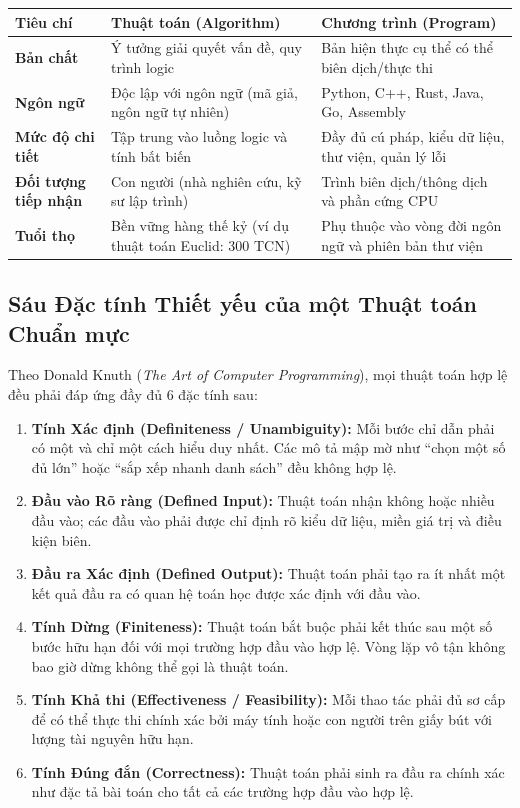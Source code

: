 \documentclass[11pt,a4paper]{article}
\begin{document}
\begin{center}
\begin{tabularx}{\textwidth}{p{3.2cm} X X}
\toprule
\textbf{Tiêu chí} & \textbf{Thuật toán (Algorithm)} & \textbf{Chương trình (Program)} \\
\midrule
\textbf{Bản chất} & Ý tưởng giải quyết vấn đề, quy trình logic & Bản hiện thực cụ thể có thể biên dịch/thực thi \\
\textbf{Ngôn ngữ} & Độc lập với ngôn ngữ (mã giả, ngôn ngữ tự nhiên) & Python, C++, Rust, Java, Go, Assembly \\
\textbf{Mức độ chi tiết} & Tập trung vào luồng logic và tính bất biến & Đầy đủ cú pháp, kiểu dữ liệu, thư viện, quản lý lỗi \\
\textbf{Đối tượng tiếp nhận} & Con người (nhà nghiên cứu, kỹ sư lập trình) & Trình biên dịch/thông dịch và phần cứng CPU \\
\textbf{Tuổi thọ} & Bền vững hàng thế kỷ (ví dụ thuật toán Euclid: 300 TCN) & Phụ thuộc vào vòng đời ngôn ngữ và phiên bản thư viện \\
\bottomrule
\end{tabularx}
\end{center}

\subsection{Sáu Đặc tính Thiết yếu của một Thuật toán Chuẩn mực}
Theo Donald Knuth (\emph{The Art of Computer Programming}), mọi thuật toán hợp lệ đều phải đáp ứng đầy đủ 6 đặc tính sau:

\begin{enumerate}[leftmargin=2em, itemsep=3pt]
    \item \textbf{Tính Xác định (Definiteness / Unambiguity):} Mỗi bước chỉ dẫn phải có một và chỉ một cách hiểu duy nhất. Các mô tả mập mờ như ``chọn một số đủ lớn'' hoặc ``sắp xếp nhanh danh sách'' đều không hợp lệ.
    \item \textbf{Đầu vào Rõ ràng (Defined Input):} Thuật toán nhận không hoặc nhiều đầu vào; các đầu vào phải được chỉ định rõ kiểu dữ liệu, miền giá trị và điều kiện biên.
    \item \textbf{Đầu ra Xác định (Defined Output):} Thuật toán phải tạo ra ít nhất một kết quả đầu ra có quan hệ toán học được xác định với đầu vào.
    \item \textbf{Tính Dừng (Finiteness):} Thuật toán bắt buộc phải kết thúc sau một số bước hữu hạn đối với mọi trường hợp đầu vào hợp lệ. Vòng lặp vô tận không bao giờ dừng không thể gọi là thuật toán.
    \item \textbf{Tính Khả thi (Effectiveness / Feasibility):} Mỗi thao tác phải đủ sơ cấp để có thể thực thi chính xác bởi máy tính hoặc con người trên giấy bút với lượng tài nguyên hữu hạn.
    \item \textbf{Tính Đúng đắn (Correctness):} Thuật toán phải sinh ra đầu ra chính xác như đặc tả bài toán cho tất cả các trường hợp đầu vào hợp lệ.
\end{enumerate}
\end{document}
